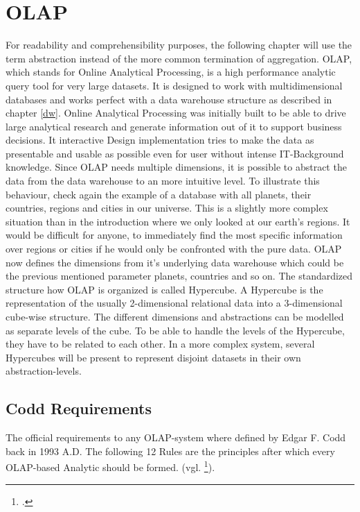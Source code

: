 \documentclass[12pt,a4paper,oneside,
liststotoc, 					%
bibtotoc,						%
titlepage, 						%
headsepline, 					%
BCOR6mm,						%
openany,							%
]{scrreprt}
\begin{document}
\section{OLAP}\label{olap}
For readability and comprehensibility purposes, the following chapter will use the term abstraction instead of the more common termination of aggregation.
OLAP, which stands for Online Analytical Processing, is a high performance analytic query tool for very large datasets. It is designed to work with multidimensional databases and works perfect with a data warehouse structure as described in chapter \ref{dw}. Online Analytical Processing was initially built to be able to drive large analytical research and generate information out of it to support business decisions. It interactive Design implementation tries to make the data as presentable and usable as possible even for user without intense IT-Background knowledge. Since OLAP needs multiple dimensions, it is possible to abstract the data from the data warehouse to an more intuitive level. To illustrate this behaviour, check again the example of a database with all planets, their countries, regions and cities in our universe. This is a slightly more complex situation than in the introduction where we only looked at our earth's regions. It would be difficult for anyone, to immediately find the most specific information over regions or cities if he would only be confronted with the pure data. OLAP now defines the dimensions from it's underlying data warehouse which could be the previous mentioned parameter planets, countries and so on. The standardized structure how OLAP is organized is called Hypercube. A Hypercube is the representation of the usually 2-dimensional relational data into a 3-dimensional cube-wise structure. The different dimensions and abstractions can be modelled as separate levels of the cube. To be able to handle the levels of the Hypercube, they have to be related to each other. In a more complex system, several Hypercubes will be present to represent disjoint datasets in their own abstraction-levels.
\subsection{Codd Requirements}\label{codd}
The official requirements to any OLAP-system where defined by Edgar F. Codd back in 1993 A.D. The following 12 Rules are the principles after which every OLAP-based Analytic should be formed. (vgl. \footcite{coddrules}).
\end{document}
